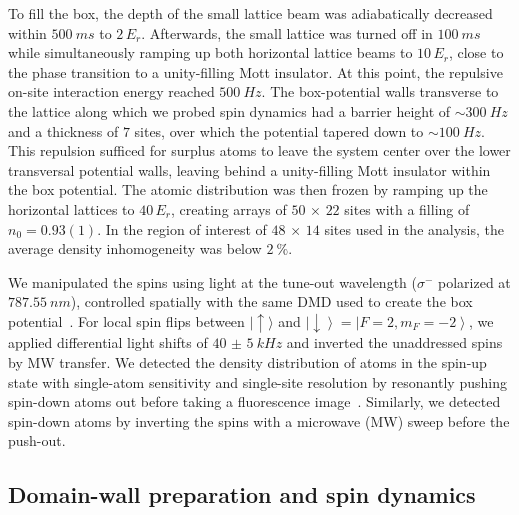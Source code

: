 \documentclass[
 reprint,
 superscriptaddress,
 amsmath,amssymb,
 aps,
 pra,
]{revtex4-2}
\newcommand{\ket}[1]{\ensuremath{\lvert #1 \rangle}\xspace}%
\begin{document}
To fill the box, the depth of the small lattice beam was adiabatically decreased within $\SI{500}{ms}$ to $2\,E_r$.
Afterwards, the small lattice was turned off in $\SI{100}{ms}$ while simultaneously ramping up both horizontal lattice beams to $10\,E_r$, close to the phase transition to a unity-filling Mott insulator.
At this point, the repulsive on-site interaction energy reached $\SI{500}{Hz}$.
The box-potential walls transverse to the lattice along which we probed spin dynamics had a barrier height of $\sim \SI{300}{Hz}$ and a thickness of $7$ sites, over which the potential tapered down to $\sim \SI{100}{Hz}$.
This repulsion sufficed for surplus atoms to leave the system center over the lower transversal potential walls, leaving behind a unity-filling Mott insulator within the box potential.
The atomic distribution was then frozen by ramping up the horizontal lattices to $40\,E_r$, creating arrays of $50\,\times\,22$ sites with a filling of $n_0 = 0.93(1)$.
In the region of interest of $48\,\times\,14$ sites used in the analysis, the average density inhomogeneity was below $\SI{2}{\percent}$.


We manipulated the spins using light at the tune-out wavelength ($\sigma^-$ polarized at $\SI{787.55}{nm}$), controlled spatially with the same DMD used to create the box potential~\cite{Weitenberg2011,Fukuhara2013}.
For local spin flips between $\ket{\uparrow}$ and $\left|\downarrow\right> = \left|F=2, m_F=-2\right>$, we applied differential light shifts of $\SI{40(5)}{kHz}$ and inverted the unaddressed spins by MW transfer.
We detected the density distribution of atoms in the spin-up state with single-atom sensitivity and single-site resolution by resonantly pushing spin-down atoms out before taking a fluorescence image~\cite{Sherson2010}.
Similarly, we detected spin-down atoms by inverting the spins with a microwave (MW) sweep before the push-out.


\subsection{Domain-wall preparation and spin dynamics \label{subsec:dw-dyn}}
\end{document}
